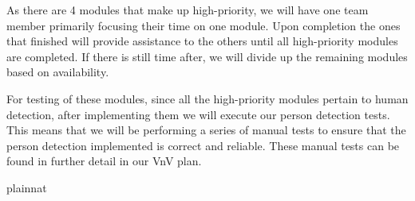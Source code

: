 \documentclass[12pt, titlepage]{article}
\begin{document}
As there are 4 modules that make up high-priority, we will have one team member primarily focusing their time on one module. Upon completion the ones that finished
will provide assistance to the others until all high-priority modules are completed. If there is still time after, we will divide up the remaining modules based on 
availability.

For testing of these modules, since all the high-priority modules pertain to human detection, after implementing them we will execute our person detection tests. This means 
that we will be performing a series of manual tests to ensure that the person detection implemented is correct and reliable. These manual tests can be found in further detail in our
VnV plan. 







 {plainnat}


\newpage{}
\end{document}
